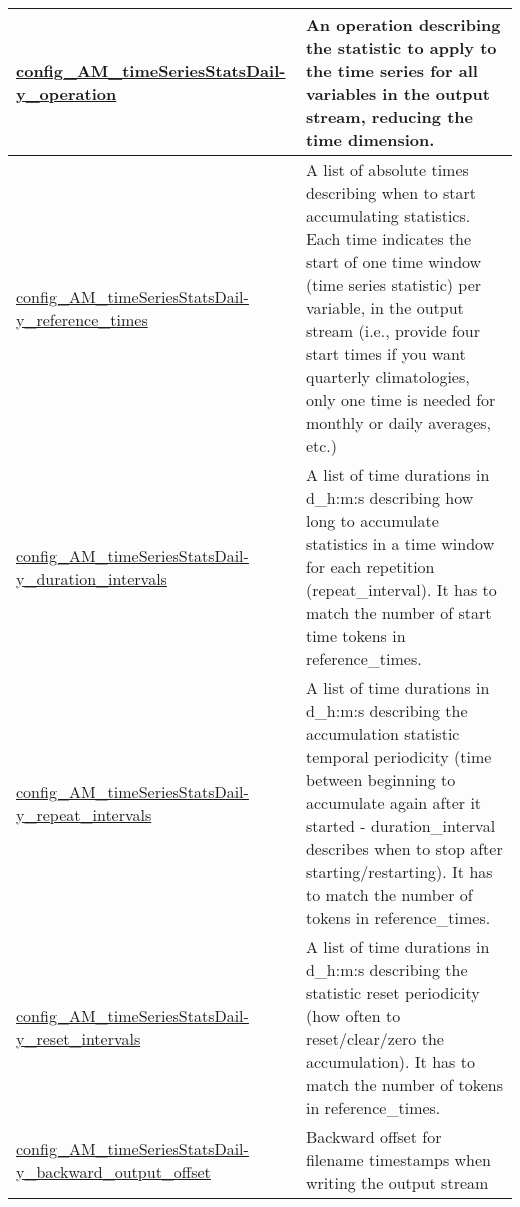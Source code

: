 {\begin{center}
\begin{longtable}{| p{2.0in} || p{4.0in} |}
    \hline
    \hyperref[subsec:nm_sec_config_AM_timeSeriesStatsDaily_operation]{config\_AM\_timeSeriesStatsDail-}\hyperref[subsec:nm_sec_config_AM_timeSeriesStatsDaily_operation]{y\_operation}& An operation describing the statistic to apply to the time series for all variables in the output stream, reducing the time dimension. \\
    \hline
    \hyperref[subsec:nm_sec_config_AM_timeSeriesStatsDaily_reference_times]{config\_AM\_timeSeriesStatsDail-}\hyperref[subsec:nm_sec_config_AM_timeSeriesStatsDaily_reference_times]{y\_reference\_times}& A list of absolute times describing when to start accumulating statistics. Each time indicates the start of one time window (time series statistic) per variable, in the output stream (i.e., provide four start times if you want quarterly climatologies, only one time is needed for monthly or daily averages, etc.) \\
    \hline
    \hyperref[subsec:nm_sec_config_AM_timeSeriesStatsDaily_duration_intervals]{config\_AM\_timeSeriesStatsDail-}\hyperref[subsec:nm_sec_config_AM_timeSeriesStatsDaily_duration_intervals]{y\_duration\_intervals}& A list of time durations in d\_h:m:s describing how long to accumulate statistics in a time window for each repetition (repeat\_interval). It has to match the number of start time tokens in reference\_times. \\
    \hline
    \hyperref[subsec:nm_sec_config_AM_timeSeriesStatsDaily_repeat_intervals]{config\_AM\_timeSeriesStatsDail-}\hyperref[subsec:nm_sec_config_AM_timeSeriesStatsDaily_repeat_intervals]{y\_repeat\_intervals}& A list of time durations in d\_h:m:s describing the accumulation statistic temporal periodicity (time between beginning to accumulate again after it started - duration\_interval describes when to stop after starting/restarting). It has to match the number of tokens in reference\_times. \\
    \hline
    \hyperref[subsec:nm_sec_config_AM_timeSeriesStatsDaily_reset_intervals]{config\_AM\_timeSeriesStatsDail-}\hyperref[subsec:nm_sec_config_AM_timeSeriesStatsDaily_reset_intervals]{y\_reset\_intervals}& A list of time durations in d\_h:m:s describing the statistic reset periodicity (how often to reset/clear/zero the accumulation). It has to match the number of tokens in reference\_times. \\
    \hline
    \hyperref[subsec:nm_sec_config_AM_timeSeriesStatsDaily_backward_output_offset]{config\_AM\_timeSeriesStatsDail-}\hyperref[subsec:nm_sec_config_AM_timeSeriesStatsDaily_backward_output_offset]{y\_backward\_output\_offset}& Backward offset for filename timestamps when writing the output stream \\
    \hline
\end{longtable}
\end{center}
}
